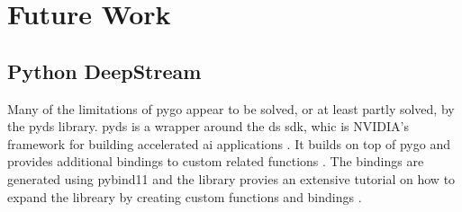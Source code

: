 \section{Future Work}

\subsection{Python DeepStream}
Many of the limitations of \gls{pygo} appear to be solved, or at least partly solved, by the \gls{pyds} library.
\gls{pyds} is a wrapper around the \gls{ds} \gls{sdk}, whic is NVIDIA's framework for building accelerated \gls{ai} applications \cite{nvidiaDeepStreamSDK2016}.
It builds on top of \gls{pygo} and provides additional bindings to custom \gs related functions \cite{nvidiaaiiotReleasesNVIDIAAIIOTDeepstream}.
The bindings are generated using \gls{pybind11} and the library provies an extensive tutorial on how to expand the libreary by creating custom functions and bindings \cite[\textit{bindings/BINDINGSGUIDE.md}]{nvidiaaiiotReleasesNVIDIAAIIOTDeepstream}.
